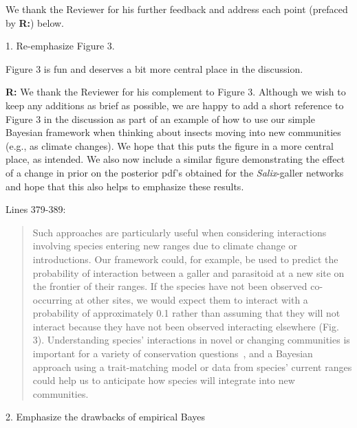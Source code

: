 \documentclass[12pt]{letter}
\newenvironment{refquote}{\bigskip \begin{it}}{\end{it}\smallskip}
\begin{document}
	We thank the Reviewer for his further feedback and address each point (prefaced by \textbf{R:}) below.

	1. Re-emphasize Figure 3. 

		\begin{refquote}

			Figure 3 is fun and deserves a bit more central place in the discussion. 

		\end{refquote}


		\textbf{R:} We thank the Reviewer for his complement to Figure 3. Although we wish to keep any additions as brief as possible, we are happy to add a short reference to Figure 3 in the discussion as part of an example of how to use our simple Bayesian framework when thinking about insects moving into new communities (e.g., as climate changes). We hope that this puts the figure in a more central place, as intended. We also now include a similar figure demonstrating the effect of a change in prior on the posterior pdf's obtained for the \emph{Salix}-galler networks and hope that this also helps to emphasize these results.


		Lines 379-389:

		\begin{quotation}

			Such approaches are particularly useful when considering interactions involving species entering new ranges due to climate change or introductions. Our framework could, for example, be used to predict the probability of interaction between a galler and parasitoid at a new site on the frontier of their ranges. If the species have not been observed co-occurring at other sites, we would expect them to interact with a probability of approximately 0.1 rather than assuming that they will not interact because they have not been observed interacting elsewhere (Fig. 3). Understanding species' interactions in novel or changing communities is important for a variety of conservation questions~\citep{Bartomeus2013,Gravel2013}, and a Bayesian approach using a trait-matching model or data from species' current ranges could help us to anticipate how species will integrate into new communities. 

		\end{quotation}


	2. Emphasize the drawbacks of empirical Bayes
\end{document}
